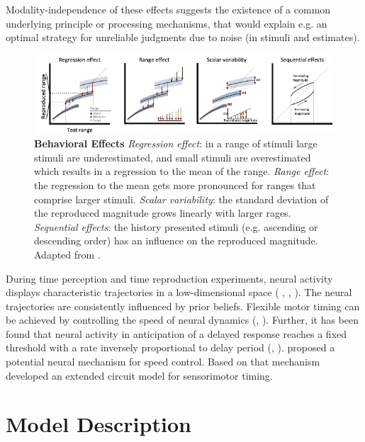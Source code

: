 \documentclass[10pt]{article}
\begin{document}
Modality-independence of these effects suggests the existence of a common underlying principle or processing mechanisms, that would explain e.g. an optimal strategy for unreliable judgments due to noise (in stimuli and estimates).

\begin{figure}[ht]
	\centering
	\includegraphics[width=\textwidth]{figures/behavioural_effects_petzschner.pdf}
	\caption{\textbf{Behavioral Effects} 
	\textit{Regression effect}: in a range of stimuli large stimuli are underestimated, and small stimuli are overestimated which results in a regression to the mean of the range.
	\textit{Range effect}: the regression to the mean gets more pronounced for ranges that comprise larger stimuli. 
	\textit{Scalar variability}: the standard deviation of the reproduced magnitude grows linearly with larger rages. 
	\textit{Sequential effects}: the history presented stimuli (e.g. ascending or descending order) has an influence on the reproduced magnitude. 
	Adapted from \cite{Petzschner2015}.}
	\label{fig:behavioraleffects}
\end{figure}

During time perception and time reproduction experiments, neural activity displays characteristic trajectories in a low-dimensional space ( \cite{Wang2018}, \cite{Henke2021}, \cite{Meirhaeghe2021}). 
The neural trajectories are consistently influenced by prior beliefs. 
Flexible motor timing can be achieved by controlling the speed of neural dynamics (\cite{Sohn2019}, \cite{Wang2018}). 
Further, it has been found that neural activity in anticipation of a delayed response reaches a fixed threshold with a rate inversely proportional to delay period (\cite{Murakami2014}, \cite{Mita2009}).
\cite{Wang2018} proposed a potential neural mechanism for speed control. Based on that mechanism \cite{Egger2020} developed an extended circuit model for sensorimotor timing.

\section{Model Description}
\end{document}
